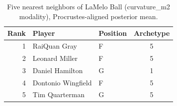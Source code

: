 \begin{table}[htbp]
  \centering\small
  \begin{tabular}{rllc}
    \toprule
    Rank & Player & Position & Archetype \\
    \midrule
    1 & RaiQuan Gray & F & 5 \\
    2 & Leonard Miller & F & 5 \\
    3 & Daniel Hamilton & G & 1 \\
    4 & Dontonio Wingfield & F & 5 \\
    5 & Tim Quarterman & G & 5 \\
    \bottomrule
  \end{tabular}
  \caption{Five nearest neighbors of LaMelo Ball (curvature_m2 modality), Procrustes-aligned posterior mean.}
  \label{tab:LaMelo_Ball_neighbors_curvature_m2}
\end{table}

